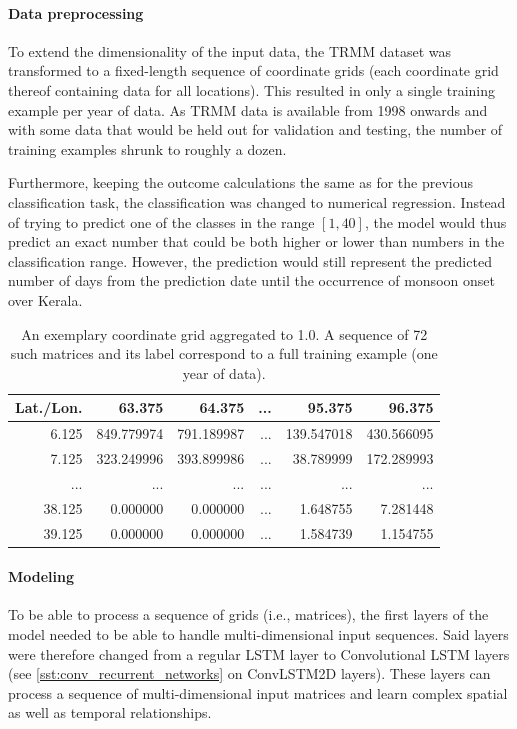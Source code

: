 \paragraph{Data preprocessing}
\label{ssst:nn_t3_data}
To extend the dimensionality of the input data, the TRMM dataset was transformed to a fixed-length sequence of coordinate grids (each coordinate grid thereof containing data for all locations). This resulted in only a single training example per year of data. As TRMM data is available from 1998 onwards and with some data that would be held out for validation and testing, the number of training examples shrunk to roughly a dozen.

Furthermore, keeping the outcome calculations the same as for the previous classification task, the classification was changed to numerical regression. Instead of trying to predict one of the classes in the range $\left[ 1, 40 \right]$, the model would thus predict an exact number that could be both higher or lower than numbers in the classification range. However, the prediction would still represent the predicted number of days from the prediction date until the occurrence of monsoon onset over Kerala.

\begin{table}[h]
  \centering
  \begin{tabular}{rrrrrr}
    \toprule
    \textbf{Lat./Lon.} & \textbf{63.375} & \textbf{64.375} & \textbf{...} & \textbf{95.375} & \textbf{96.375} \\
    \midrule
    6.125 & 849.779974 & 791.189987 & ... & 139.547018 & 430.566095 \\
    7.125 & 323.249996 & 393.899986 & ... & 38.789999 & 172.289993 \\
    ... & ... & ... & ... & ... & ...\\
    38.125 & 0.000000 & 0.000000 & ... & 1.648755 & 7.281448 \\
    39.125 & 0.000000 & 0.000000 & ... & 1.584739 & 1.154755 \\
    \bottomrule
  \end{tabular}
  \caption{An exemplary coordinate grid aggregated to 1.0\degree. A sequence of 72 such matrices and its label correspond to a full training example (one year of data).}
  \label{tab:nn_t3_data}
\end{table}

\paragraph{Modeling}
\label{ssst:nn_t3_model}
To be able to process a sequence of grids (i.e., matrices), the first layers of the model needed to be able to handle multi-dimensional input sequences. Said layers were therefore changed from a regular LSTM layer to Convolutional LSTM layers (see \cref{sst:conv_recurrent_networks} on ConvLSTM2D layers). These layers can process a sequence of multi-dimensional input matrices and learn complex spatial as well as temporal relationships.

